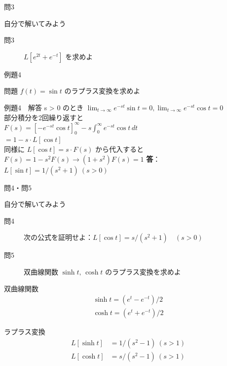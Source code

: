 \documentclass[professionalfonts]{beamer}
\begin{document}
\begin{frame}{問3}
  \begin{exampleblock}{自分で解いてみよう}
  \begin{description}
    \item[問3] $L[e^{2t} + e^{-t}]$ を求めよ
  \end{description}
  \end{exampleblock}
\end{frame}

\begin{frame}{例題4}
  \begin{exampleblock}{問題}
    $f(t) = \sin t$ のラプラス変換を求めよ\\[2pt]
  \end{exampleblock}
\end{frame}

\begin{frame}{例題4　解答}
  s > 0 のとき $\lim_{t \to \infty} e^{-st}\sin t = 0, \lim_{t \to \infty} e^{-st}\cos t = 0$\\[4pt]
  部分積分を2回繰り返すと\\[4pt]
  $F(s) = [-e^{-st}\cos t]_{0}^\infty - s\int_{0}^\infty e^{-st}\cos t\, dt$\\[4pt]
  $= 1 - s\cdot L[\cos t]$\\[4pt]
  同様に $L[\cos t] = s\cdot F(s)$ から代入すると\\[4pt]
  $F(s) = 1 - s^{2}F(s)   \to   (1 + s^{2})F(s) = 1$
  \medskip\textbf{答}：$L[\sin t] = 1/(s^{2}+1) \ (s > 0)$
\end{frame}

\begin{frame}{問4・問5}
  \begin{exampleblock}{自分で解いてみよう}
  \begin{description}
    \item[問4] 次の公式を証明せよ：$L[\cos t] = s/(s^2+1) \quad (s > 0)$
    \item[問5] 双曲線関数 $\sinh t,\, \cosh t$ のラプラス変換を求めよ
  \end{description}
  \end{exampleblock}
\end{frame}

\begin{frame}{双曲線関数}
  \begin{align*}
    \sinh t = (e^t - e^{-t}) / 2 \\
    \cosh t = (e^t + e^{-t}) / 2
  \end{align*}
  \begin{block}{ラプラス変換}
  \begin{align*}
    L[\sinh t] &= 1/(s^{2}-1) \ (s > 1) \\
    L[\cosh t] &= s/(s^{2}-1) \ (s > 1)
  \end{align*}
  \end{block}
\end{frame}
\end{document}
